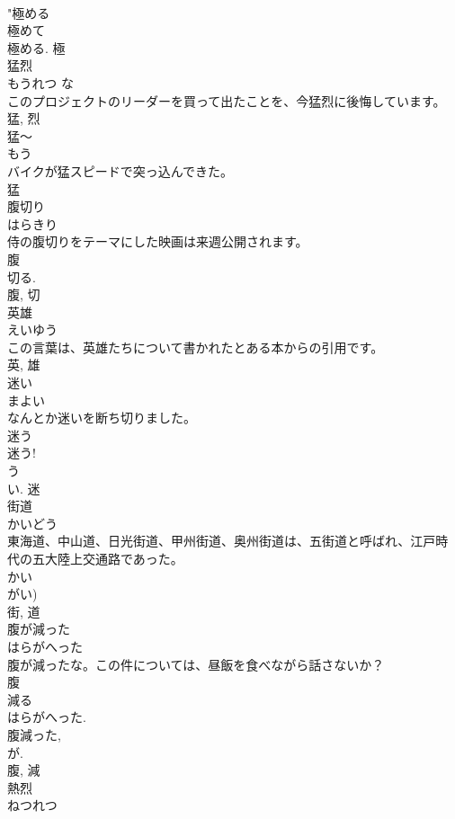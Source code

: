 \documentclass[8pt]{extreport}
\begin{document}
\begin{CJK}{UTF8}{min}
\\	"極める 
\\	極めて 
\\	極める.	極	
\\	猛烈	
\\	もうれつ	な 
\\	このプロジェクトのリーダーを買って出たことを、今猛烈に後悔しています。	
\\	猛, 烈	
\\	猛〜	
\\	もう	
\\	バイクが猛スピードで突っ込んできた。	
\\	猛	
\\	腹切り	
\\	はらきり	
\\	侍の腹切りをテーマにした映画は来週公開されます。	
\\	腹 
\\	切る. 
\\	腹, 切	
\\	英雄	
\\	えいゆう	
\\	この言葉は、英雄たちについて書かれたとある本からの引用です。	
\\	英, 雄	
\\	迷い	
\\	まよい	
\\	なんとか迷いを断ち切りました。	
\\	迷う 
\\	迷う! 
\\	う 
\\	い.	迷	
\\	街道	
\\	かいどう	
\\	東海道、中山道、日光街道、甲州街道、奥州街道は、五街道と呼ばれ、江戸時代の五大陸上交通路であった。	
\\	かい 
\\	がい) 
\\	街, 道	
\\	腹が減った	
\\	はらがへった	
\\	腹が減ったな。この件については、昼飯を食べながら話さないか？	
\\	腹 
\\	減る 
\\	はらがへった. 
\\	腹減った, 
\\	が. 
\\	腹, 減	
\\	熱烈	
\\	ねつれつ	

\end{CJK}
\end{document}

